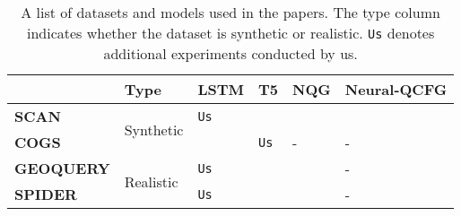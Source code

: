 \begin{table}[]
\centering
\footnotesize
\begin{tabular}{llllll}
\toprule
         & \textbf{Type}                       & \textbf{LSTM} & \textbf{T5} & \textbf{NQG} & \textbf{Neural-QCFG} \\
         \midrule
\textbf{SCAN}     & \multirow{2}{*}{Synthetic} & \texttt{Us}    &  \cite{shaw-etal-2021-compositional}  &   \cite{shaw-etal-2021-compositional}  &  \cite{kim2021sequencetosequence}           \\
\textbf{COGS}     &                            & \cite{kim-linzen-2020-cogs}     & \texttt{Us}  & -   & -           \\
\midrule
\textbf{GEOQUERY} & \multirow{2}{*}{Realistic} & \texttt{Us}    & \cite{shaw-etal-2021-compositional}   &  \cite{shaw-etal-2021-compositional}   & -           \\
\textbf{SPIDER}   &                            & \texttt{Us}    & \cite{shaw-etal-2021-compositional}   &  \cite{shaw-etal-2021-compositional}   & -           \\
\bottomrule
\end{tabular}
\caption{A list of datasets and models used in the papers.
The type column indicates whether the dataset is synthetic or realistic. \texttt{Us} denotes additional experiments conducted by us.}
\label{tab:exp-list}
\end{table}